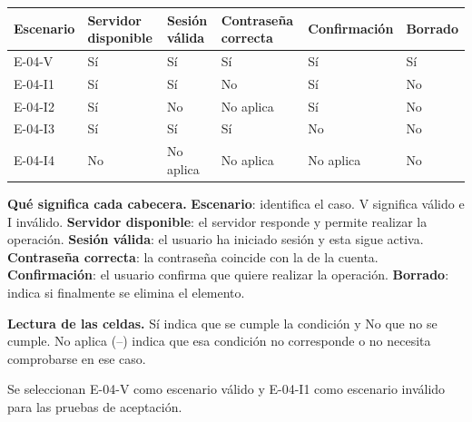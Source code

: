 \begingroup\fontsize{7.8}{11}\selectfont\setlength{\tabcolsep}{3pt}
\begin{tabularx}{\linewidth}{@{}*{6}{Y}@{}}\toprule
\textbf{Escenario} & \textbf{Servidor disponible} & \textbf{Sesión válida} & \textbf{Contraseña correcta} & \textbf{Confirmación} & \textbf{Borrado}\\\midrule
E-04-V & Sí & Sí & Sí & Sí & Sí\\[3pt]
E-04-I1 & Sí & Sí & No & Sí & No\\[3pt]
E-04-I2 & Sí & No & No aplica & Sí & No\\[3pt]
E-04-I3 & Sí & Sí & Sí & No & No\\[3pt]
E-04-I4 & No & No aplica & No aplica & No aplica & No\\[3pt]
\bottomrule\end{tabularx}\endgroup\par
{\fontsize{9}{11}\selectfont\textbf{Qué significa cada cabecera.} \textbf{Escenario}: identifica el caso. V significa válido e I inválido. \textbf{Servidor disponible}: el servidor responde y permite realizar la operación. \textbf{Sesión válida}: el usuario ha iniciado sesión y esta sigue activa. \textbf{Contraseña correcta}: la contraseña coincide con la de la cuenta. \textbf{Confirmación}: el usuario confirma que quiere realizar la operación. \textbf{Borrado}: indica si finalmente se elimina el elemento.\par\textbf{Lectura de las celdas.} Sí indica que se cumple la condición y No que no se cumple. No aplica (--) indica que esa condición no corresponde o no necesita comprobarse en ese caso.\par}


Se seleccionan E-04-V como escenario válido y E-04-I1 como escenario inválido para las pruebas de aceptación.\par


